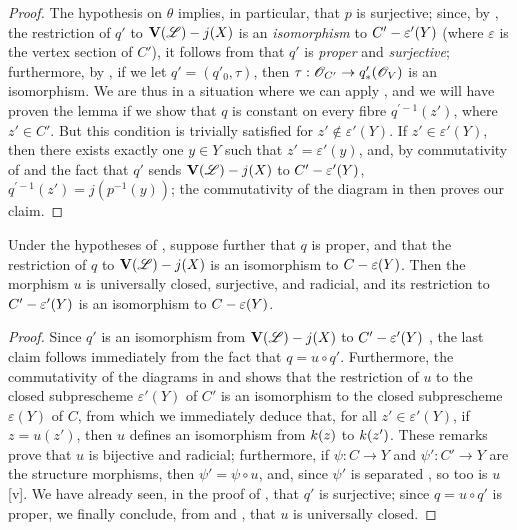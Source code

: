 \begin{proof}
The hypothesis on $\theta$ implies, in particular, that $p$ is surjective;
since, by , the restriction of $q'$ to $\mathbf{V}(\mathscr{L})- j(X)$ is an \emph{isomorphism} to $C'-\varepsilon'(Y)$ (where $\varepsilon$ is the vertex section of $C'$), it follows from  that $q'$ is \emph{proper} and \emph{surjective};
furthermore, by , if we let $q'=(q'_0,\tau)$, then $\tau:\sh{O}_{C'}\to q'_*(\sh{O}_V)$ is an isomorphism.
We are thus in a situation where we can apply , and we will have proven the lemma if we show that $q$ is constant on every fibre $q^{'-1}(z')$, where $z'\in C'$.
But this condition is trivially satisfied for $z'\not\in\varepsilon'(Y)$.
If $z'\in\varepsilon'(Y)$, then there exists exactly one $y\in Y$ such that $z'=\varepsilon'(y)$, and, by commutativity of  and the fact that $q'$ sends $\mathbf{V}(\mathscr{L})- j(X)$ to $C'-\varepsilon'(Y)$, $q^{'-1}(z')=j(p^{-1}(y))$;
the commutativity of the diagram in  then proves our claim.
\end{proof}

\begin{corollary}[8.11.6]
\label{II.8.11.6}
Under the hypotheses of , suppose further that $q$ is proper, and that the restriction of $q$ to $\mathbf{V}(\mathscr{L})- j(X)$ is an isomorphism to $C-\varepsilon(Y)$.
Then the morphism $u$ is universally closed, surjective, and radicial, and its restriction to $C'-\varepsilon'(Y)$ is an isomorphism to $C-\varepsilon(Y)$.
\end{corollary}

\begin{proof}
Since $q'$ is an isomorphism from $\mathbf{V}(\mathscr{L})- j(X)$ to $C'-\varepsilon'(Y)$ , the last claim follows immediately from the fact that $q=u\circ q'$.
Furthermore, the commutativity of the diagrams
in  and  shows that the restriction of $u$ to the closed subprescheme $\varepsilon'(Y)$ of $C'$ is an isomorphism to the closed subprescheme $\varepsilon(Y)$ of $C$, from which we immediately deduce that, for all $z'\in\varepsilon'(Y)$, if $z=u(z')$, then $u$ defines an isomorphism from $k(z)$ to $k(z')$.
These remarks prove that $u$ is bijective and radicial;
furthermore, if $\psi:C\to Y$ and $\psi':C'\to Y$ are the structure morphisms, then $\psi'=\psi\circ u$, and, since $\psi'$ is separated , so too is $u$ [v].
We have already seen, in the proof of , that $q'$ is surjective;
since $q=u\circ q'$ is proper, we finally conclude, from  and , that $u$ is universally closed.
\end{proof}

